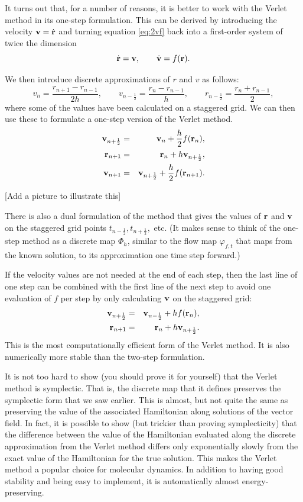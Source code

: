 \documentclass{article}
\begin{document}
It turns out that, for a number of reasons, it is better to work with the Verlet method in its one-step formulation. This can be derived by introducing the velocity ${\bf v}=\dot{\bf r}$ and turning equation \ref{eq:2vf} back into a first-order system of twice the dimension
$$
	\dot{\bf r} = {\bf v},\qquad \dot{\bf v} = f({\bf r}).
$$

We then introduce discrete approximations of $r$ and $v$ as follows:
$$
v_n =\frac{r_{n+1}-r_{n-1}}{2h},\qquad v_{n-\frac12} = \frac{r_n-r_{n-1}}{h}, \qquad r_{n-\frac12} = \frac{r_n + r_{n-1}}{2},
$$
where some of the values have been calculated on a staggered grid. We can then use these to formulate a one-step version of the Verlet method. 
\begin{eqnarray*}
	{\bf v}_{n+\frac12} &=& {\bf v}_n+\frac{h}{2}f({\bf r}_n),\\
	{\bf r}_{n+1} &=& {\bf r}_n +h{\bf v}_{n+\frac12},\\
	{\bf v}_{n+1} &=& {\bf v}_{n+\frac12}+\frac{h}{2}f({\bf r}_{n+1}).
\end{eqnarray*}

[Add a picture to illustrate this]

There is also a dual formulation of the method that gives the values of ${\bf r}$ and ${\bf v}$ on the staggered grid points $t_{n-\frac12},t_{n+\frac12},$ etc.
(It makes sense to think of the one-step method as a discrete map $\Phi_h$, similar to the flow map $\varphi_{f,t}$ that maps from the known solution, to its approximation one time step forward.)

If the velocity values are not needed at the end of each step, then the last line of one step can be combined with the first line of the next step to avoid one evaluation of $f$ per step by only calculating ${\bf v}$ on the staggered grid:
\begin{eqnarray*}
	{\bf v}_{n+\frac12} &=& {\bf v}_{n-\frac12}+hf({\bf r}_n),\\
	{\bf r}_{n+1} &=& {\bf r}_n +h{\bf v}_{n+\frac12}.
\end{eqnarray*}
This is the most computationally efficient form of the Verlet method. It is also numerically more stable than the two-step formulation.

It is not too hard to show (you should prove it for yourself) that the Verlet method is symplectic. That is, the discrete map that it defines preserves the symplectic form that we saw earlier. This is almost, but not quite the same as preserving the value of the associated Hamiltonian along solutions of the vector field. In fact, it is possible to show (but trickier than proving symplecticity) that the difference between the value of the Hamiltonian evaluated along the discrete approximation from the Verlet method differs only exponentially slowly from the exact value of the Hamiltonian for the true solution. This makes the Verlet method a popular choice for molecular dynamics. In addition to having good stability and being easy to implement, it is automatically almost energy-preserving.
\end{document}
